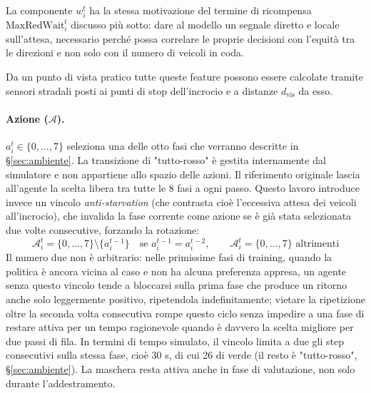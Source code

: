 La componente $w_i^t$ ha la stessa motivazione del termine di ricompensa
$\mathrm{MaxRedWait}_i^t$ discusso più sotto: dare al modello un segnale
diretto e locale sull'attesa, necessario perché possa correlare le
proprie decisioni con l'equità tra le direzioni e non solo con il numero
di veicoli in coda.

Da un punto di vista pratico tutte queste feature possono essere calcolate tramite sensori stradali
posti ai punti di stop dell'incrocio e a distanze $d_{\text{vis}}$ da esso.

\paragraph{Azione ($\mathcal{A}$).} $a_i^t \in \{0, \dots, 7\}$ seleziona una delle otto fasi che verranno descritte in §\ref{sec:ambiente}.
La transizione di "tutto-rosso" è gestita internamente dal simulatore e non appartiene allo spazio delle azioni.
Il riferimento originale lascia all'agente la scelta libera tra tutte le
8 fasi a ogni passo. Questo lavoro introduce invece un vincolo
\emph{anti-starvation} (che contrasta cioè l'eccessiva attesa dei
veicoli all'incrocio), che invalida la fase corrente come azione se è
già stata selezionata due volte consecutive, forzando la rotazione:
\begin{equation}
  \mathcal{A}_i^t = \{0,\dots,7\} \setminus \{a_i^{t-1}\} \quad \text{se } a_i^{t-1} = a_i^{t-2}, \qquad \mathcal{A}_i^t = \{0,\dots,7\} \text{ altrimenti}
  \label{eq:action-mask}
\end{equation}
Il numero due non è arbitrario: nelle primissime fasi di training, quando
la politica è ancora vicina al caso e non ha alcuna preferenza appresa,
un agente senza questo vincolo tende a bloccarsi sulla prima fase che
produce un ritorno anche solo leggermente positivo, ripetendola
indefinitamente; vietare la ripetizione oltre la seconda volta
consecutiva rompe questo ciclo senza impedire a una fase di restare
attiva per un tempo ragionevole quando è davvero la scelta migliore per
due passi di fila. In termini di tempo simulato, il vincolo limita a due
gli step consecutivi sulla stessa fase, cioè 30 s, di cui 26 di verde (il
resto è "tutto-rosso", §\ref{sec:ambiente}). La maschera resta attiva
anche in fase di valutazione, non solo durante l'addestramento.

